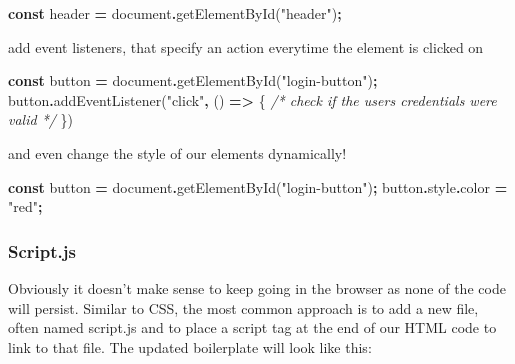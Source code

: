 \documentclass[
]{article}
\newenvironment{Shaded}{\begin{snugshade}}{\end{snugshade}}
\newcommand{\AttributeTok}[1]{\textcolor[rgb]{0.77,0.63,0.00}{#1}}
\newcommand{\BuiltInTok}[1]{#1}
\newcommand{\CommentTok}[1]{\textcolor[rgb]{0.56,0.35,0.01}{\textit{#1}}}
\newcommand{\FunctionTok}[1]{\textcolor[rgb]{0.00,0.00,0.00}{#1}}
\newcommand{\KeywordTok}[1]{\textcolor[rgb]{0.13,0.29,0.53}{\textbf{#1}}}
\newcommand{\NormalTok}[1]{#1}
\newcommand{\OperatorTok}[1]{\textcolor[rgb]{0.81,0.36,0.00}{\textbf{#1}}}
\newcommand{\StringTok}[1]{\textcolor[rgb]{0.31,0.60,0.02}{#1}}
\begin{document}
\begin{Shaded}
\begin{Highlighting}[]
\KeywordTok{const}\NormalTok{ header }\OperatorTok{=} \BuiltInTok{document}\OperatorTok{.}\FunctionTok{getElementById}\NormalTok{(}\StringTok{"header"}\NormalTok{)}\OperatorTok{;}
\end{Highlighting}
\end{Shaded}

add event listeners, that specify an action everytime the element is clicked on

\begin{Shaded}
\begin{Highlighting}[]
\KeywordTok{const}\NormalTok{ button }\OperatorTok{=} \BuiltInTok{document}\OperatorTok{.}\FunctionTok{getElementById}\NormalTok{(}\StringTok{"login{-}button"}\NormalTok{)}\OperatorTok{;}
\NormalTok{button}\OperatorTok{.}\FunctionTok{addEventListener}\NormalTok{(}\StringTok{"click"}\OperatorTok{,}\NormalTok{ () }\KeywordTok{=\textgreater{}}\NormalTok{ \{}
  \CommentTok{/* check if the user\textquotesingle{}s credentials were valid */}
\NormalTok{\})}
\end{Highlighting}
\end{Shaded}

and even change the style of our elements dynamically!

\begin{Shaded}
\begin{Highlighting}[]
\KeywordTok{const}\NormalTok{ button }\OperatorTok{=} \BuiltInTok{document}\OperatorTok{.}\FunctionTok{getElementById}\NormalTok{(}\StringTok{"login{-}button"}\NormalTok{)}\OperatorTok{;}
\NormalTok{button}\OperatorTok{.}\AttributeTok{style}\OperatorTok{.}\AttributeTok{color} \OperatorTok{=} \StringTok{"red"}\OperatorTok{;}
\end{Highlighting}
\end{Shaded}

\hypertarget{script.js}{%
\subsubsection*{Script.js}\label{script.js}}

Obviously it doesn't make sense to keep going in the browser as none of the code will persist. Similar to CSS, the most common approach is to add a new file, often named script.js and to place a script tag at the end of our HTML code to link to that file. The updated boilerplate will look like this:
\end{document}
